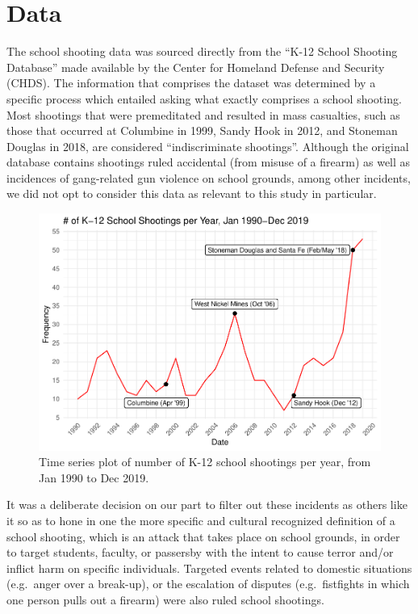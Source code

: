 \documentclass[12pt]{article}
\begin{document}
\hypertarget{data}{%
\section{Data}\label{data}}

The school shooting data was sourced directly from the ``K-12 School Shooting Database'' made available by the Center for Homeland Defense and Security (CHDS). The information that comprises the dataset was determined by a specific process which entailed asking what exactly comprises a school shooting. Most shootings that were premeditated and resulted in mass casualties, such as those that occurred at Columbine in 1999, Sandy Hook in 2012, and Stoneman Douglas in 2018, are considered ``indiscriminate shootings''. Although the original database contains shootings ruled accidental (from misuse of a firearm) as well as incidences of gang-related gun violence on school grounds, among other incidents, we did not opt to consider this data as relevant to this study in particular.

\begin{figure}
\includegraphics[width=0.65\linewidth,style="float:right; padding:10px]{JStevenRaquel_STATS295_Final_files/figure-latex/ts-plot-1990-2019-1} \caption{Time series plot of number of K-12 school shootings per year, from Jan 1990 to Dec 2019.}\label{fig:ts-plot-1990-2019}
\end{figure}

It was a deliberate decision on our part to filter out these incidents as others like it so as to hone in one the more specific and cultural recognized definition of a school shooting, which is an attack that takes place on school grounds, in order to target students, faculty, or passersby with the intent to cause terror and/or inflict harm on specific individuals. Targeted events related to domestic situations (e.g.~anger over a break-up), or the escalation of disputes (e.g.~fistfights in which one person pulls out a firearm) were also ruled school shootings.
\end{document}
